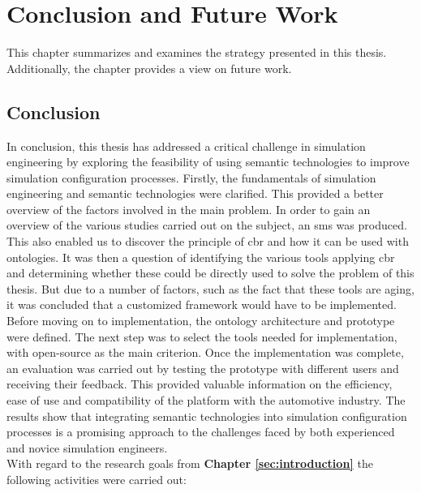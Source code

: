 \section{Conclusion and Future Work\label{sec:conclusion}}

This chapter summarizes and examines the strategy presented in this thesis. Additionally, the chapter provides a view on future work.

\subsection{Conclusion}

In conclusion, this thesis has addressed a critical challenge in simulation engineering by exploring the feasibility of using semantic technologies to improve simulation configuration processes. Firstly, the fundamentals of simulation engineering and semantic technologies were clarified. This provided a better overview of the factors involved in the main problem. In order to gain an overview of the various studies carried out on the subject, an \acrshort{sms} was produced. This also enabled us to discover the principle of \acrshort{cbr} and how it can be used with ontologies. It was then a question of identifying the various tools applying \acrshort{cbr} and determining whether these could be directly used to solve the problem of this thesis. But due to a number of factors, such as the fact that these tools are aging, it was concluded that a customized framework would have to be implemented. Before moving on to implementation, the ontology architecture and prototype were defined. The next step was to select the tools needed for implementation, with open-source as the main criterion. Once the implementation was complete, an evaluation was carried out by testing the prototype with different users and receiving their feedback. This provided valuable information on the efficiency, ease of use and compatibility of the platform with the automotive industry. The results show that integrating semantic technologies into simulation configuration processes is a promising approach to the challenges faced by both experienced and novice simulation engineers.\\

With regard to the research goals from \textbf{Chapter \ref{sec:introduction}} the following activities
were carried out:

